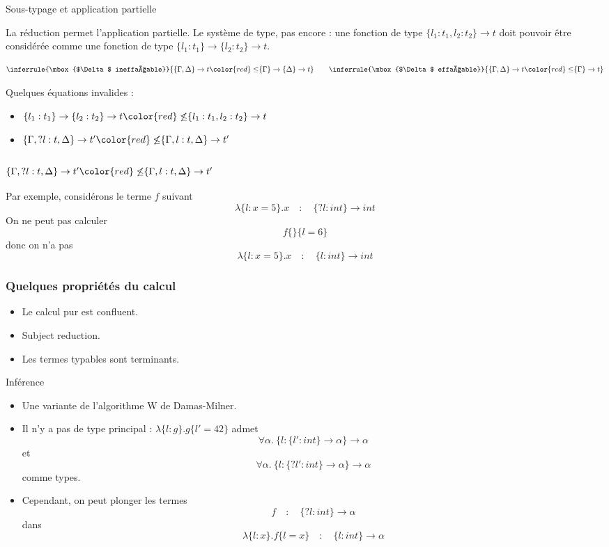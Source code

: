 \documentclass{beamer}
\newcommand{\univ}[2]{\forall #1.~ #2}
\newcommand{\mabs}[2]{\lambda\{#1\}.#2}
\newcommand{\tmabs}[2]{\{#1\}\to #2}
\newcommand{\mapp}[2]{#1\{#2\}}
\begin{document}
\begin{ssl}{Sous-typage et application partielle}

  La réduction permet l'application partielle. Le système de type, pas encore :
  une fonction de type $\tmabs{l_1:t_1,l_2:t_2}{t}$ doit pouvoir être considérée
  comme une fonction de type $\tmabs{l_1:t_1}{\tmabs{l_2:t_2}{t}}$.

  \[
  \inferrule{\mbox{$\Delta$ ineffaçable}}{
    \{ \Gamma, \Delta \}\rightarrow t {\color{red}\leq}
    \{\Gamma\}\rightarrow\{\Delta\}\rightarrow t
  }
  \qquad
  \inferrule{\mbox{$\Delta$ effaçable}}{
    \{ \Gamma, \Delta \}\rightarrow t {\color{red}\leq} \{\Gamma\}\rightarrow t
  }
  \]

  \bigskip
  Quelques équations invalides :
  \begin{itemize}
  \item $
    \tmabs{l_1:t_1}{\tmabs{l_2:t_2}{t}}
    {\color{red}\not\leq}
    \tmabs{l_1:t_1,l_2:t_2}{t}
    $
  \item $\tmabs{\Gamma,?l:t,\Delta}{t'} {\color{red}\not\leq}
    \tmabs{\Gamma,l:t,\Delta}{t'}$
  \end{itemize}
\end{ssl}

\begin{frame}
  \frametitle{$\tmabs{\Gamma,?l:t,\Delta}{t'} {\color{red}\not\leq}
    \tmabs{\Gamma,l:t,\Delta}{t'}$}


  Par exemple, considérons le terme $f$ suivant
  \[
  \mabs{l:x=5}{x}\quad:\quad\tmabs{?l:int}{int}
  \]
  On ne peut pas calculer
  \[
  \mapp{\mapp{f}{}}{l=6}
  \]
  donc on n'a pas
  \[
  \mabs{l:x=5}{x}\quad:\quad\tmabs{l:int}{int}
  \]
\end{frame}

\begin{frame}
  \frametitle{Quelques propriétés du calcul}
  \begin{itemize}
  \item Le calcul pur est confluent.
  \item Subject reduction.
  \item Les termes typables sont terminants.
  \end{itemize}
\end{frame}

\begin{ssl}{Inférence}
  \begin{itemize}
  \item Une variante de l'algorithme W de Damas-Milner.
  \item<2-> Il n'y a pas de type principal : $\mabs{l:g}{\mapp{g}{l'=42}}$ admet
    \[
    \univ\alpha{\tmabs{l:\tmabs{l':int}\alpha}\alpha}
    \]
    et
    \[
    \univ\alpha{\tmabs{l:\tmabs{?l':int}\alpha}\alpha}
    \]
    comme types.
    \item<3-> Cependant, on peut plonger les termes
      \[
      f
      \quad:\quad
      \tmabs{?l:int}\alpha
      \]
      dans
      \[
      \mabs{l:x}{\mapp{f}{l=x}}
      \quad:\quad
      \tmabs{l:int}\alpha
      \]
  \end{itemize}
\end{ssl}
\end{document}
